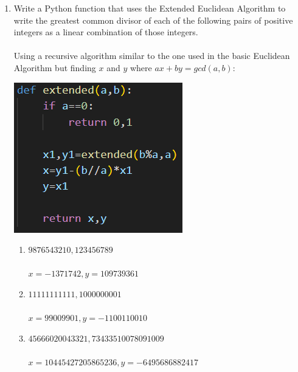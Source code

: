 \documentclass[]{article}
\begin{document}
\begin{enumerate}
    \item Write a Python function that uses the Extended Euclidean Algorithm to write the greatest common divisor of each of the following pairs of positive integers as a linear combination of those integers.
    \\\\Using a recursive algorithm similar to the one used in the basic Euclidean Algorithm but finding $x$ and $y$ where $ax+by=gcd(a,b)$:
    \begin{center}
        \includegraphics[scale=0.5]{Images/ExtendedEuclid.png}
    \end{center}
    \begin{enumerate}
        \item $9876543210, 123456789$
        \\\\$x=-1371742,y=109739361$
        \item $11111111111, 1000000001$
        \\\\$x=99009901,y=-1100110010$
        \item $45666020043321, 73433510078091009$
        \\\\$x=10445427205865236,y=-6495686882417$
    \end{enumerate}
    

\end{enumerate}
\end{document}

